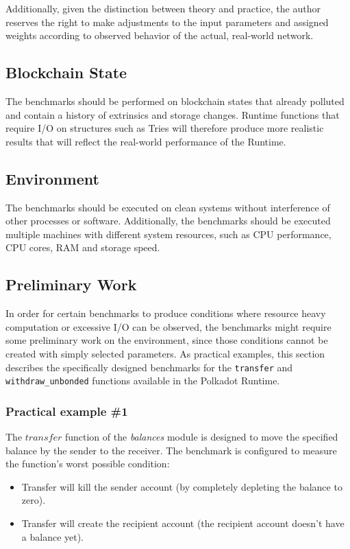 \documentclass[11pt,a4paper]{article}
\begin{document}
Additionally, given the distinction between theory and practice, the author reserves the right
to make adjustments to the input parameters and assigned weights according to observed behavior
of the actual, real-world network.

\subsection{Blockchain State}
The benchmarks should be performed on blockchain states that already polluted and contain a history of
extrinsics and storage changes. Runtime functions that require I/O on structures
such as Tries will therefore produce more realistic results that will reflect the real-world
performance of the Runtime.

\subsection{Environment}
The benchmarks should be executed on clean systems without interference of other processes
or software. Additionally, the benchmarks should be executed multiple machines with different
system resources, such as CPU performance, CPU cores, RAM and storage speed.

\subsection{Preliminary Work}
In order for certain benchmarks to produce conditions where resource heavy computation or excessive
I/O can be observed, the benchmarks might require some preliminary work on the environment, since those
conditions cannot be created with simply selected parameters.
As practical examples, this section describes the specifically designed benchmarks for the \verb|transfer|
and \verb|withdraw_unbonded| functions available in the Polkadot Runtime.

\subsubsection{Practical example \#1}
The $transfer$ function of the \textit{balances} module is designed to move the specified balance by the sender to the receiver.
The benchmark is configured to measure the function's worst possible condition:

\begin{itemize}
  \item Transfer will kill the sender account (by completely depleting the balance to zero).
  \item Transfer will create the recipient account (the recipient account doesn't have a balance yet).
\end{itemize}
\end{document}
